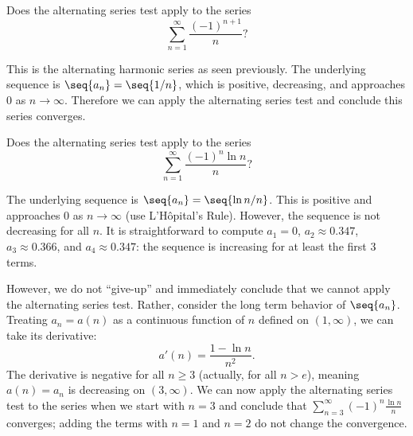 \documentclass{ximera}
\begin{document}
\begin{question}
  Does the alternating series test apply to the series
  \[
  \sum_{n=1}^\infty \frac{(-1)^{n+1}}{n} ?
  \]
  \begin{prompt}
    \begin{multipleChoice}
    \end{multipleChoice}
    \begin{feedback}
      This is the alternating harmonic series as seen previously. The
      underlying sequence is $\seq{a_n} = \seq{1/n}$, which is
      positive, decreasing, and approaches 0 as
      $n\to\infty$. Therefore we can apply the alternating series test
      and conclude this series converges.
      
    \end{feedback}
  \end{prompt}
  \begin{question}
    Does the alternating series test apply to the series
    \[
    \sum_{n=1}^\infty \frac{(-1)^n\ln n}{n}?
    \]
    \begin{prompt}
      \begin{multipleChoice}
      \end{multipleChoice}
      \begin{feedback}
        The underlying sequence is $\seq{a_n} = \seq{\ln n/n}$. This
        is positive and approaches $0$ as $n\to\infty$ (use
        L'H\^opital's Rule). However, the sequence is not decreasing
        for all $n$. It is straightforward to compute $a_1=0$,
        $a_2\approx0.347$, $a_3\approx 0.366$, and $a_4\approx 0.347$:
        the sequence is increasing for at least the first $3$ terms.
      
        However, we do not ``give-up'' and immediately conclude that we
        cannot apply the alternating series test. Rather, consider the
        long term behavior of $\seq{a_n}$. Treating $a_n=a(n)$ as a
        continuous function of $n$ defined on $(1,\infty)$, we can take
        its derivative:
        \[
        a'(n) = \frac{1-\ln n}{n^2}.
        \]
        The derivative is negative for all $n\geq 3$ (actually, for
        all $n>e$), meaning $a(n)=a_n$ is decreasing on
        $(3,\infty)$. We can now apply the alternating series test to
        the series when we start with $n=3$ and conclude that
        $\sum_{n=3}^\infty(-1)^n\frac{\ln n}{n}$ converges; adding the
        terms with $n=1$ and $n=2$ do not change the convergence.
        

\end{feedback}
\end{prompt}
\end{question}
\end{question}
\end{document}
